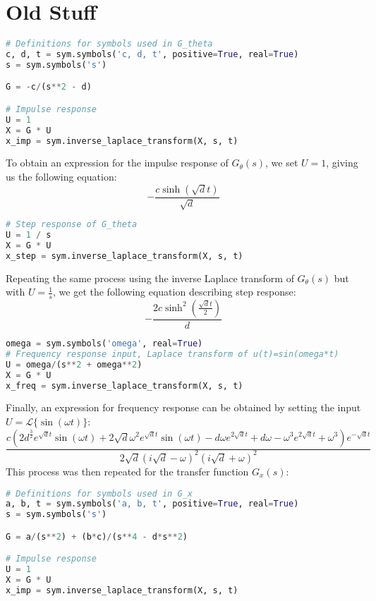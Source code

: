 \documentclass[a4paper,10pt,reqno]{amsart}
\numberwithin{equation}{section}
\newcommand{\lap}{\mathscr{L}}
\begin{document}
\section{Old Stuff}
\begin{lstlisting}[language=python]
# Definitions for symbols used in G_theta
c, d, t = sym.symbols('c, d, t', positive=True, real=True)
s = sym.symbols('s')

G = -c/(s**2 - d)

# Impulse response
U = 1
X = G * U
x_imp = sym.inverse_laplace_transform(X, s, t)
\end{lstlisting}
To obtain an expression for the impulse response of $G_\theta(s)$, we set $U=1$, giving us the following equation:
\begin{equation}
    - \frac{c \sinh{\left(\sqrt{d} t \right)}}{\sqrt{d}}
\end{equation}
\begin{lstlisting}[language=python]
# Step response of G_theta
U = 1 / s
X = G * U
x_step = sym.inverse_laplace_transform(X, s, t)
\end{lstlisting}
Repeating the same process using the inverse Laplace transform of $G_\theta(s)$ but with $U=\frac{1}{s}$, we get the following equation describing step response:
\begin{equation}
    - \frac{2 c \sinh^{2}{\left(\frac{\sqrt{d} t}{2} \right)}}{d}
\end{equation}
\begin{lstlisting}[language=python]
omega = sym.symbols('omega', real=True)
# Frequency response input, Laplace transform of u(t)=sin(omega*t)
U = omega/(s**2 + omega**2)
X = G * U
x_freq = sym.inverse_laplace_transform(X, s, t)
\end{lstlisting}
Finally, an expression for frequency response can be obtained by setting the input $U=\lap \{ \sin(\omega t) \}$:
\begin{equation}
    \frac{c \left(2 d^{\frac{3}{2}} e^{\sqrt{d} t} \sin{\left(\omega t \right)} + 2 \sqrt{d} \omega^{2} e^{\sqrt{d} t} \sin{\left(\omega t \right)} - d \omega e^{2 \sqrt{d} t} + d \omega - \omega^{3} e^{2 \sqrt{d} t} + \omega^{3}\right) e^{- \sqrt{d} t}}{2 \sqrt{d} \left(i \sqrt{d} - \omega\right)^{2} \left(i \sqrt{d} + \omega\right)^{2}}
\end{equation}
This process was then repeated for the transfer function $G_x(s)$:
\begin{lstlisting}[language=python]
# Definitions for symbols used in G_x
a, b, t = sym.symbols('a, b, t', positive=True, real=True)
s = sym.symbols('s')

G = a/(s**2) + (b*c)/(s**4 - d*s**2)

# Impulse response
U = 1
X = G * U
x_imp = sym.inverse_laplace_transform(X, s, t)
\end{lstlisting}
\end{document}
